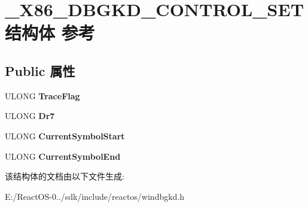 \hypertarget{struct___x86___d_b_g_k_d___c_o_n_t_r_o_l___s_e_t}{}\section{\+\_\+\+X86\+\_\+\+D\+B\+G\+K\+D\+\_\+\+C\+O\+N\+T\+R\+O\+L\+\_\+\+S\+E\+T结构体 参考}
\label{struct___x86___d_b_g_k_d___c_o_n_t_r_o_l___s_e_t}
\subsection*{Public 属性}
\begin{DoxyCompactItemize}
\item 
\mbox{\label{struct___x86___d_b_g_k_d___c_o_n_t_r_o_l___s_e_t_ad1916f9c80f67bfcdaae42ea1fd7b92a}} 
U\+L\+O\+NG {\bfseries Trace\+Flag}
\item 
\mbox{\label{struct___x86___d_b_g_k_d___c_o_n_t_r_o_l___s_e_t_adca3d0dc9734bf305bc92ccae370cc04}} 
U\+L\+O\+NG {\bfseries Dr7}
\item 
\mbox{\label{struct___x86___d_b_g_k_d___c_o_n_t_r_o_l___s_e_t_ad9cae66b8b284ec17045cead57d451f7}} 
U\+L\+O\+NG {\bfseries Current\+Symbol\+Start}
\item 
\mbox{\label{struct___x86___d_b_g_k_d___c_o_n_t_r_o_l___s_e_t_ac49bbfe920a09dd62e843cb16e9c9beb}} 
U\+L\+O\+NG {\bfseries Current\+Symbol\+End}
\end{DoxyCompactItemize}


该结构体的文档由以下文件生成\+:\begin{DoxyCompactItemize}
\item 
E\+:/\+React\+O\+S-\/0../sdk/include/reactos/windbgkd.\+h\end{DoxyCompactItemize}

